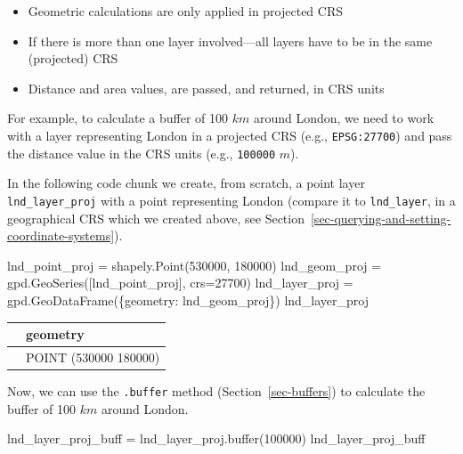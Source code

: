 \documentclass[
  letterpaper,
]{krantz}
\newenvironment{Shaded}{\begin{snugshade}}{\end{snugshade}}
\newcommand{\BuiltInTok}[1]{\textcolor[rgb]{0.00,0.23,0.31}{#1}}
\newcommand{\DecValTok}[1]{\textcolor[rgb]{0.68,0.00,0.00}{#1}}
\newcommand{\NormalTok}[1]{\textcolor[rgb]{0.00,0.23,0.31}{#1}}
\newcommand{\OperatorTok}[1]{\textcolor[rgb]{0.37,0.37,0.37}{#1}}
\newcommand{\StringTok}[1]{\textcolor[rgb]{0.13,0.47,0.30}{#1}}
\providecommand{\tightlist}{%
  \setlength{\itemsep}{0pt}\setlength{\parskip}{0pt}}\usepackage{longtable,booktabs,array}
\begin{document}
\begin{itemize}
\tightlist
\item
  Geometric calculations are only applied in projected CRS
\item
  If there is more than one layer involved---all layers have to be in
  the same (projected) CRS
\item
  Distance and area values, are passed, and returned, in CRS units
\end{itemize}

For example, to calculate a buffer of 100 \(km\) around London, we need
to work with a layer representing London in a projected CRS (e.g.,
\texttt{EPSG:27700}) and pass the distance value in the CRS units (e.g.,
\texttt{100000} \(m\)).

In the following code chunk we create, from scratch, a point layer
\texttt{lnd\_layer\_proj} with a point representing London (compare it
to \texttt{lnd\_layer}, in a geographical CRS which we created above,
see Section~\ref{sec-querying-and-setting-coordinate-systems}).

\begin{Shaded}
\begin{Highlighting}[]
\NormalTok{lnd\_point\_proj }\OperatorTok{=}\NormalTok{ shapely.Point(}\DecValTok{530000}\NormalTok{, }\DecValTok{180000}\NormalTok{)}
\NormalTok{lnd\_geom\_proj }\OperatorTok{=}\NormalTok{ gpd.GeoSeries([lnd\_point\_proj], crs}\OperatorTok{=}\DecValTok{27700}\NormalTok{)}
\NormalTok{lnd\_layer\_proj }\OperatorTok{=}\NormalTok{ gpd.GeoDataFrame(\{}\StringTok{\textquotesingle{}geometry\textquotesingle{}}\NormalTok{: lnd\_geom\_proj\})}
\NormalTok{lnd\_layer\_proj}
\end{Highlighting}
\end{Shaded}

\begin{longtable}[]{@{}ll@{}}
\toprule\noalign{}
& geometry \\
\midrule\noalign{}
\endhead
\bottomrule\noalign{}
\endlastfoot
0 & POINT (530000 180000) \\
\end{longtable}

Now, we can use the \texttt{.buffer} method (Section~\ref{sec-buffers})
to calculate the buffer of 100 \(km\) around London.

\begin{Shaded}
\begin{Highlighting}[]
\NormalTok{lnd\_layer\_proj\_buff }\OperatorTok{=}\NormalTok{ lnd\_layer\_proj.}\BuiltInTok{buffer}\NormalTok{(}\DecValTok{100000}\NormalTok{)}
\NormalTok{lnd\_layer\_proj\_buff}
\end{Highlighting}
\end{Shaded}
\end{document}
